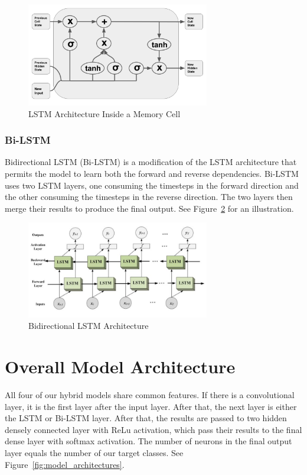 \documentclass[journal]{IEEEtran}
\begin{document}
      \begin{figure}[h]
        \centering
        \includegraphics[width=8cm]{figures/jordan_lstm_architecture.png}
        \caption{LSTM Architecture Inside a Memory Cell}
        \label{fig:lstm_architecture}
      \end{figure}

    \subsubsection{Bi-LSTM}
      Bidirectional LSTM (Bi-LSTM) is a modification of the LSTM architecture that permits the model to learn both the
      forward and reverse dependencies. Bi-LSTM uses two LSTM layers, one consuming
      the timesteps in the forward direction and the other consuming the timesteps in the reverse direction.
      The two layers then merge their results to produce the final output. See Figure~\ref{fig:bidirectional_diagram}
      for an illustration.

      \begin{figure}[h]
        \centering
        \includegraphics[width=8cm]{figures/bidirectional-lstm.jpeg}
        \caption{Bidirectional LSTM Architecture}
        \label{fig:bidirectional_diagram}
      \end{figure}

\section{Overall Model Architecture}

  All four of our hybrid models share common features. If there is a convolutional
  layer, it is the first layer after the input layer. After that,
  the next layer is either the LSTM or Bi-LSTM layer. After that,
  the results are passed to two hidden densely connected layer with ReLu activation,
  which pass their results to the final dense layer with
  softmax activation. The number of neurons in the final output layer
  equals the number of our target classes. See Figure~\ref{fig:model_architectures}.
\end{document}
